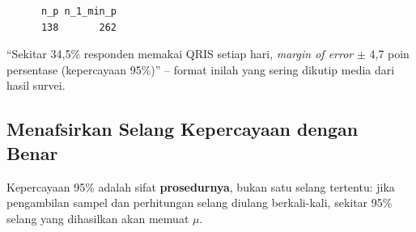 \documentclass[
  indonesian,
  letterpaper,
]{book}
\begin{document}
\begin{verbatim}
      n_p n_1_min_p 
      138       262 
\end{verbatim}

``Sekitar 34,5\% responden memakai QRIS setiap hari, \emph{margin of
error} \(\pm\) 4,7 poin persentase (kepercayaan 95\%)'' -- format inilah
yang sering dikutip media dari hasil survei.

\subsection{Menafsirkan Selang Kepercayaan dengan
Benar}\label{menafsirkan-selang-kepercayaan-dengan-benar}

Kepercayaan 95\% adalah sifat \textbf{prosedurnya}, bukan satu selang
tertentu: jika pengambilan sampel dan perhitungan selang diulang
berkali-kali, sekitar 95\% selang yang dihasilkan akan memuat \(\mu\).
\end{document}

